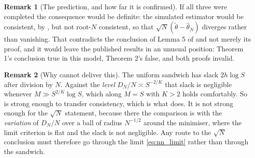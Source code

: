 \documentclass[11pt]{article}
\theoremstyle{definition}
\newtheorem{remark}[remark]{Remark}
\begin{document}
\begin{remark}[The prediction, and how far it is confirmed]
If all three were completed the consequence would be definite: the simulated estimator would be consistent, by , but not root-$N$ consistent, so that $\sqrt N(\widetilde\theta-\widehat\theta_N)$ diverges rather than vanishing. That contradicts the conclusion of Lemma 5 of \citet{BrandtSantaClara2002} and not merely its proof, and it would leave the published results in an unusual position: Theorem 1's conclusion true in this model, Theorem 2's false, and both proofs invalid.
\end{remark}



\begin{remark}[Why  cannot deliver this]\label{rem:h2_cannot}
The uniform sandwich has slack $2h\log S$ after division by $N$. Against the \emph{level} $D_N/N\asymp S^{-2/K}$ that slack is negligible whenever $M\gg S^{2/K}\log S$, which along $M=S$ with $K>2$ holds comfortably. So  is strong enough to transfer consistency, which is what  does. It is not strong enough for the $\sqrt N$ statement, because there the comparison is with the \emph{variation} of $D_N/N$ over a ball of radius $N^{-1/2}$ around the minimiser, where the limit criterion is flat and the slack is not negligible. Any route to the $\sqrt N$ conclusion must therefore go through the limit \eqref{eq:nn_limit} rather than through the sandwich.
\end{remark}
\end{document}
